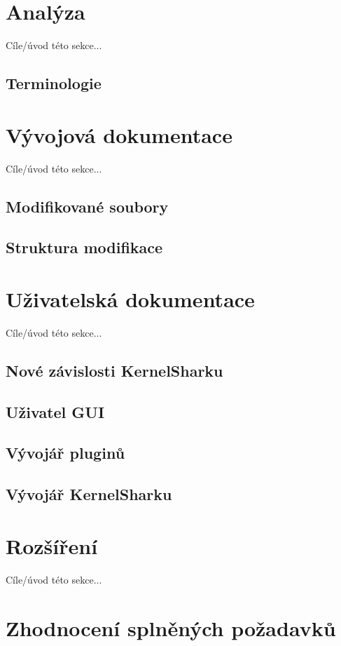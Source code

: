 \section{Analýza}
Cíle/úvod této sekce...


\subsection{Terminologie}


\section{Vývojová dokumentace}
Cíle/úvod této sekce...

\subsection{Modifikované soubory}

\subsection{Struktura modifikace}

\section{Uživatelská dokumentace}
Cíle/úvod této sekce...

\subsection{Nové závislosti KernelSharku}

\subsection{Uživatel GUI}

\subsection{Vývojář pluginů}

\subsection{Vývojář KernelSharku}

\section{Rozšíření}
Cíle/úvod této sekce...

\section{Zhodnocení splněných požadavků}